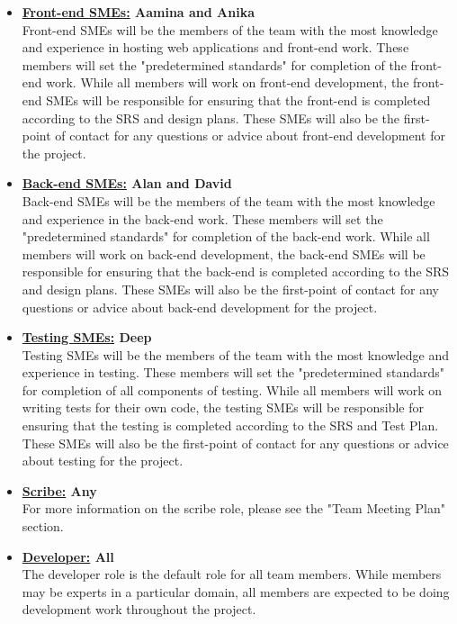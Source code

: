\documentclass{article}
\begin{document}
\begin{itemize}
	\item \textbf{\underline{Front-end SMEs:} Aamina and Anika} \\
	Front-end SMEs will be the members of the team with the most knowledge and experience in hosting web applications and front-end work. 
	These members will set the "predetermined standards" for completion of the front-end work. 
	While all members will work on front-end development, the front-end SMEs will be responsible for ensuring that the front-end is completed according to the SRS and design plans. 
	These SMEs will also be the first-point of contact for any questions or advice about front-end development for the project.\\

	\item \textbf{\underline{Back-end SMEs:} Alan and David} \\
	Back-end SMEs will be the members of the team with the most knowledge and experience in the back-end work. 
	These members will set the "predetermined standards" for completion of the back-end work.
	While all members will work on back-end development, the back-end SMEs will be responsible for ensuring that the back-end is completed according to the SRS and design plans.
	These SMEs will also be the first-point of contact for any questions or advice about back-end development for the project.\\

	\item \textbf{\underline{Testing SMEs:} Deep} \\
	Testing SMEs will be the members of the team with the most knowledge and experience in testing.
	These members will set the "predetermined standards" for completion of all components of testing. 
	While all members will work on writing tests for their own code, the testing SMEs will be responsible for ensuring that the testing is completed according to the SRS and Test Plan. 
	These SMEs will also be the first-point of contact for any questions or advice about testing for the project.\\

	\item \textbf{\underline{Scribe:} Any} \\
	For more information on the scribe role, please see the "Team Meeting Plan" section.\\

	\item \textbf{\underline{Developer:} All} \\
	The developer role is the default role for all team members. 
	While members may be experts in a particular domain, all members are expected to be doing development work throughout the project. \\
	
\end{itemize}
\end{document}
